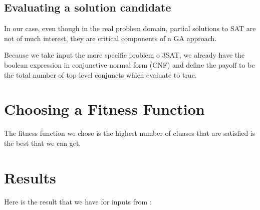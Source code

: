 \documentclass{article}
\begin{document}
\subsection{Evaluating a solution candidate}
In our case, even though in the real
problem domain, partial solutions to SAT are not of much
interest, they are critical components of a GA approach.

Because we take input the more specific problem o 3SAT, 
we already have the boolean expression in conjunctive normal form (CNF) 
and define the payoff to be the total number of 
top level conjuncts which evaluate to true.



\section{Choosing a Fitness Function}
The fitness function we chose is the highest number of cluases that are satisfied is the best that we can get.

\section{Results}
Here is the result that we have for inputs from \cite{input} : 
\end{document}
